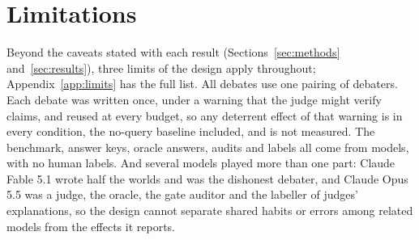 \section{Limitations}
\label{sec:limits}


Beyond the caveats stated with each result (Sections~\ref{sec:methods} and~\ref{sec:results}), three limits of the
design apply throughout; Appendix~\ref{app:limits} has the full list. All debates use one pairing of debaters. Each
debate was written once, under a warning that the judge might verify claims, and reused at every budget, so any
deterrent effect of that warning is in every condition, the no-query baseline included, and is not measured. The
benchmark, answer keys, oracle answers, audits and labels all come from models, with no human labels. And several models played more than one part: Claude
Fable 5.1 wrote half the worlds and was the dishonest debater, and Claude Opus 5.5 was a judge, the oracle, the gate
auditor and the labeller of judges' explanations, so the design cannot separate shared habits or errors among
related models from the effects it reports.

